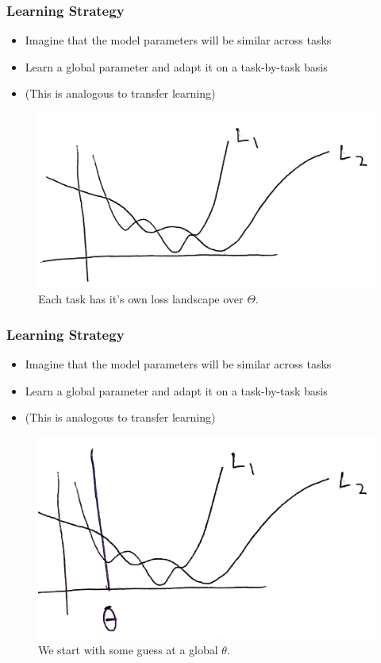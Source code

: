 \documentclass[10pt,mathserif]{beamer}
\begin{document}
\begin{frame}
  \frametitle{Learning Strategy}
 \begin{itemize}
 \item Imagine that the model parameters will be similar across tasks
 \item Learn a global parameter and adapt it on a task-by-task basis
 \item (This is analogous to transfer learning)
 \end{itemize}
\begin{figure}[ht]
  \centering
  \includegraphics[width=0.6\paperwidth]{figure/maml_learning_1}
  \caption{Each task has it's own loss landscape over
    $\Theta$. \label{fig:maml_learning_1} }
\end{figure}
\end{frame}

\begin{frame}
  \frametitle{Learning Strategy}
 \begin{itemize}
 \item Imagine that the model parameters will be similar across tasks
 \item Learn a global parameter and adapt it on a task-by-task basis
 \item (This is analogous to transfer learning)
   \end{itemize}
\begin{figure}[ht]
  \centering
  \includegraphics[width=0.6\paperwidth]{figure/maml_learning_0}
  \caption{We start with some guess at a global
    $\theta$. \label{fig:maml_learning_2} }
\end{figure}
\end{frame}
\end{document}
